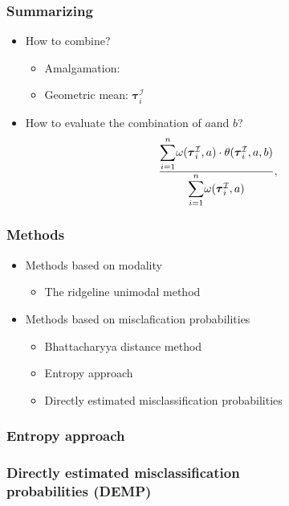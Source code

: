 \begin{frame}
\frametitle{Summarizing}

\begin{itemize}
\item How to combine?
\begin{itemize}
\item Amalgamation:
\item Geometric mean: ${\boldsymbol\tau}^{\mathcal{I}}_i$
\end{itemize}
\item How to evaluate the combination of $a$and $b$?
\[ \frac{  
  \mathlarger\sum_{i=1}^n
		\omega ({\boldsymbol\tau}^{\mathcal{I}}_i, a) \cdot
		\theta ({\boldsymbol\tau}^{\mathcal{I}}_i, a, b)
}{  
	\mathlarger\sum_{i=1}^n  
		\omega ({\boldsymbol\tau}^{\mathcal{I}}_i, a) 
}, \]
\end{itemize}
\end{frame}

\begin{frame}
\frametitle{Methods}
\begin{itemize}
\item Methods based on modality
\begin{itemize}
\item The ridgeline unimodal method
\end{itemize}
\item Methods based on misclafication probabilities
\begin{itemize}
\item Bhattacharyya distance method
\item Entropy approach
\item Directly estimated misclassification probabilities
\end{itemize}
\end{itemize}
\end{frame}


\begin{frame}
\frametitle{Entropy approach}
\end{frame}

\begin{frame}
\frametitle{Directly estimated misclassification \\probabilities (DEMP)}
\end{frame}
